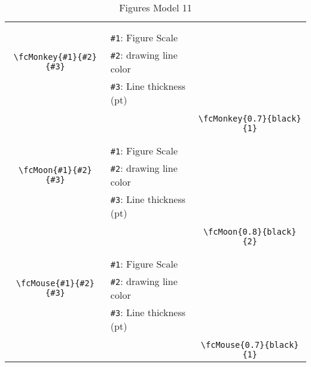 \documentclass{article}
\begin{document}
\begin{table}[H]
\begin{tabular}{|c|l|c|}
	&&\multirow{5}{*}{\fcMonkey{0.7}{black}{1}}\\	&&\\	&\verb|#1|: Figure Scale &\\	\verb|\fcMonkey{#1}{#2}{#3}|&	\verb|#2|: drawing line color &\\	&\verb|#3|: Line thickness (pt) &\\ &&\\&&	\verb|\fcMonkey{0.7}{black}{1}|\\\hline 	
	&&\multirow{5}{*}{\fcMoon{0.8}{black}{2}}\\	&&\\	&\verb|#1|: Figure Scale &\\	\verb|\fcMoon{#1}{#2}{#3}|&	\verb|#2|: drawing line color &\\	&\verb|#3|: Line thickness (pt) &\\ &&\\&&	\verb|\fcMoon{0.8}{black}{2}|\\\hline 	
	&&\multirow{5}{*}{\fcMouse{0.7}{black}{1}}\\	&&\\	&\verb|#1|: Figure Scale &\\	\verb|\fcMouse{#1}{#2}{#3}|&	\verb|#2|: drawing line color &\\	&\verb|#3|: Line thickness (pt) &\\ &&\\&&	\verb|\fcMouse{0.7}{black}{1}|\\\hline 	\hline\end{tabular}\caption{Figures Model 11}\label{tab11}\end{table}
\end{document}

